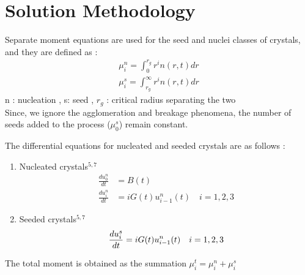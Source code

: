 
\section{Solution Methodology}

Separate moment equations are used for the seed and nuclei classes of crystals, and they are defined as : 
\begin{align}
\mu^{n}_{i} = \int_{0}^{r_{g}} r^{i}n(r,t) dr \\
\mu^{s}_{i} = \int_{r_{g}}^{\infty} r^{i}n(r,t) dr
\end{align}
n : nucleation , s: seed , $r_{g}$  : critical radius separating the two \\  
Since, we ignore the agglomeration and breakage phenomena, the number of seeds added to the process ($\mu_{0}^{s}$) remain constant.

The differential equations for nucleated and seeded crystals are as follows :

\begin{enumerate}

\item Nucleated crystals$^{5,7}$ 
\begin{align}
\frac{du_{0}^{n}}{dt} &= B(t) \\
\frac{du_{i}^{n}}{dt} &= iG(t)u_{i-1}^{n}(t) \quad  i = 1,2,3
\end{align}

\item Seeded crystals$^{5,7}$
\begin{equation}
\frac{du_{i}^{s}}{dt} = iG(t)u_{i-1}^{n}(t) \quad  i = 1,2,3 \\
\end{equation}

\end{enumerate}
The total moment is obtained as the summation $\mu_{i}^{t} = \mu_{i}^{n} + \mu_{i}^{s}$